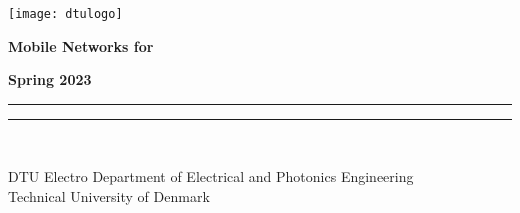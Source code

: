 \begin{titlepage}%
\noindent{}\texttt{[image: dtulogo]}%

\noindent\parbox[t][5.8cm][c]{\textwidth}{\centering\bfseries{\Huge{}Mobile Networks for}\\}

\noindent\parbox[t][1.2cm][b]{\textwidth}{\hfill{}{\large\bfseries{}Spring 2023}}

\noindent\rule{\textwidth}{.5mm}

%

\begin{center}
%
\end{center}


\noindent\parbox[t][1cm][b]{\textwidth}{}

\noindent\rule{\textwidth}{.5mm}\\%
\begin{minipage}{\textwidth}\raggedleft
\vspace{2mm}DTU Electro Department of Electrical and Photonics Engineering\\%
Technical University of Denmark
\end{minipage}
\end{titlepage}
